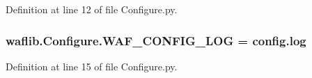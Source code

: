 Definition at line 12 of file Configure.\+py.

\subsubsection[{\texorpdfstring{W\+A\+F\+\_\+\+C\+O\+N\+F\+I\+G\+\_\+\+L\+OG}{WAF_CONFIG_LOG}}]{ waflib.\+Configure.\+W\+A\+F\+\_\+\+C\+O\+N\+F\+I\+G\+\_\+\+L\+OG = \textquotesingle{}config.\+log\textquotesingle{}}\hypertarget{namespacewaflib_1_1_configure_aa2b3105588e04e1ca9287184bc12f67c}{}\label{namespacewaflib_1_1_configure_aa2b3105588e04e1ca9287184bc12f67c}


Definition at line 15 of file Configure.\+py.

